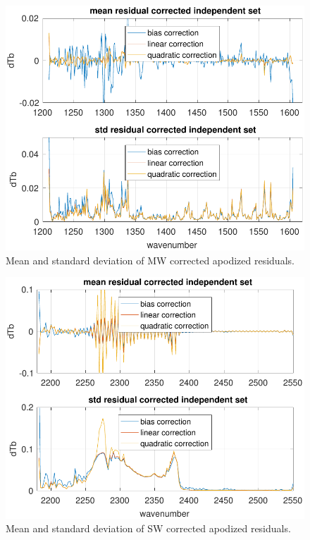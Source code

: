 \documentclass[10pt,twocolumn]{article}  %
\begin{document}
\begin{figure} %
  \centering
  \includegraphics[width=\linewidth]{figures/a2cris_regr_MW.pdf}
  \caption{Mean and standard deviation of MW corrected apodized
    residuals.}
  \label{statMW}
\end{figure}

\begin{figure} %
  \centering
  \includegraphics[width=\linewidth]{figures/a2cris_regr_SW.pdf}
  \caption{Mean and standard deviation of SW corrected apodized
    residuals.}
  \label{statSW}
\end{figure}
\end{document}
